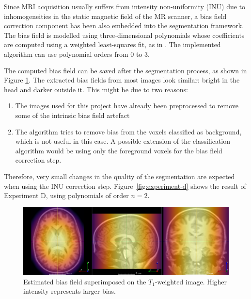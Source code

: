 
Since MRI acquisition usually suffers from intensity non-uniformity (INU) due to inhomogeneities in the static magnetic field of the MR scanner, a bias field correction component has been also embedded into the segmentation framework. The bias field is modelled using three-dimensional polynomials whose coefficients are computed using a weighted least-squares fit, as in \cite{leemput_automated_1999}. The implemented algorithm can use polynomial orders from 0 to 3.

The computed bias field can be saved after the segmentation process, as shown in Figure \ref{fig:bias-field}. The extracted bias fields from most images look similar: bright in the head and darker outside it. This might be due to two reasons:
\begin{enumerate}
  \item The images used for this project have already been preprocessed to remove some of the intrinsic bias field artefact
  \item The algorithm tries to remove bias from the voxels classified as background, which is not useful in this case. A possible extension of the classification algorithm would be using only the foreground voxels for the bias field correction step.
\end{enumerate}
Therefore, very small changes in the quality of the segmentation are expected when using the INU correction step. Figure~\ref{fig:experiment-d} shows the result of Experiment D, using polynomials of order $n = 2$.

\begin{figure}
  \centering
  \includegraphics[width=\textwidth]{figures/bias_field}
  \caption{Estimated bias field superimposed on the $T_1$-weighted image. Higher intensity represents larger bias.}
  \label{fig:bias-field}
\end{figure}

